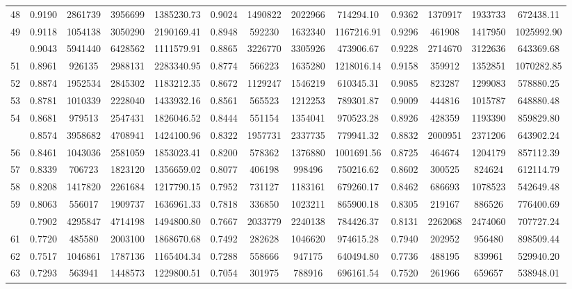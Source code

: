 \documentclass[
  12pt,
]{article}
\begin{document}
\begin{longtable}[t]{lcccccccccccc}
48 & 0.9190 & 2861739 & 3956699 & 1385230.73 & 0.9024 & 1490822 & 2022966 & 714294.10 & 0.9362 & 1370917 & 1933733 & 672438.11\\
49 & 0.9118 & 1054138 & 3050290 & 2190169.41 & 0.8948 & 592230 & 1632340 & 1167216.91 & 0.9296 & 461908 & 1417950 & 1025992.90\\
\addlinespace
50 & 0.9043 & 5941440 & 6428562 & 1111579.91 & 0.8865 & 3226770 & 3305926 & 473906.67 & 0.9228 & 2714670 & 3122636 & 643369.68\\
51 & 0.8961 & 926135 & 2988131 & 2283340.95 & 0.8774 & 566223 & 1635280 & 1218016.14 & 0.9158 & 359912 & 1352851 & 1070282.85\\
52 & 0.8874 & 1952534 & 2845302 & 1183212.35 & 0.8672 & 1129247 & 1546219 & 610345.31 & 0.9085 & 823287 & 1299083 & 578880.25\\
53 & 0.8781 & 1010339 & 2228040 & 1433932.16 & 0.8561 & 565523 & 1212253 & 789301.87 & 0.9009 & 444816 & 1015787 & 648880.48\\
54 & 0.8681 & 979513 & 2547431 & 1826046.52 & 0.8444 & 551154 & 1354041 & 970523.28 & 0.8926 & 428359 & 1193390 & 859829.80\\
\addlinespace
55 & 0.8574 & 3958682 & 4708941 & 1424100.96 & 0.8322 & 1957731 & 2337735 & 779941.32 & 0.8832 & 2000951 & 2371206 & 643902.24\\
56 & 0.8461 & 1043036 & 2581059 & 1853023.41 & 0.8200 & 578362 & 1376880 & 1001691.56 & 0.8725 & 464674 & 1204179 & 857112.39\\
57 & 0.8339 & 706723 & 1823120 & 1356659.02 & 0.8077 & 406198 & 998496 & 750216.62 & 0.8602 & 300525 & 824624 & 612114.79\\
58 & 0.8208 & 1417820 & 2261684 & 1217790.15 & 0.7952 & 731127 & 1183161 & 679260.17 & 0.8462 & 686693 & 1078523 & 542649.48\\
59 & 0.8063 & 556017 & 1909737 & 1636961.33 & 0.7818 & 336850 & 1023211 & 865900.18 & 0.8305 & 219167 & 886526 & 776400.69\\
\addlinespace
60 & 0.7902 & 4295847 & 4714198 & 1494800.80 & 0.7667 & 2033779 & 2240138 & 784426.37 & 0.8131 & 2262068 & 2474060 & 707727.24\\
61 & 0.7720 & 485580 & 2003100 & 1868670.68 & 0.7492 & 282628 & 1046620 & 974615.28 & 0.7940 & 202952 & 956480 & 898509.44\\
62 & 0.7517 & 1046861 & 1787136 & 1165404.34 & 0.7288 & 558666 & 947175 & 640494.80 & 0.7736 & 488195 & 839961 & 529940.20\\
63 & 0.7293 & 563941 & 1448573 & 1229800.51 & 0.7054 & 301975 & 788916 & 696161.54 & 0.7520 & 261966 & 659657 & 538948.01\\

\end{longtable}
\end{document}
